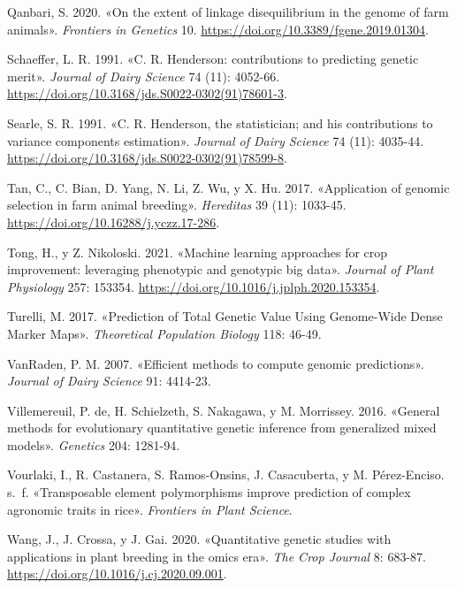 \documentclass[11pt,spanish,a4paper,oneside,]{book} %
\begin{document}
\leavevmode\hypertarget{ref-cite:36}{}%
Qanbari, S. 2020. «On the extent of linkage disequilibrium in the genome of farm animals». \emph{Frontiers in Genetics} 10. \url{https://doi.org/10.3389/fgene.2019.01304}.

\leavevmode\hypertarget{ref-cite:27}{}%
Schaeffer, L. R. 1991. «C. R. Henderson: contributions to predicting genetic merit». \emph{Journal of Dairy Science} 74 (11): 4052-66. \url{https://doi.org/10.3168/jds.S0022-0302(91)78601-3}.

\leavevmode\hypertarget{ref-cite:29}{}%
Searle, S. R. 1991. «C. R. Henderson, the statistician; and his contributions to variance components estimation». \emph{Journal of Dairy Science} 74 (11): 4035-44. \url{https://doi.org/10.3168/jds.S0022-0302(91)78599-8}.

\leavevmode\hypertarget{ref-cite:34}{}%
Tan, C., C. Bian, D. Yang, N. Li, Z. Wu, y X. Hu. 2017. «Application of genomic selection in farm animal breeding». \emph{Hereditas} 39 (11): 1033-45. \url{https://doi.org/10.16288/j.yczz.17-286}.

\leavevmode\hypertarget{ref-cite:7}{}%
Tong, H., y Z. Nikoloski. 2021. «Machine learning approaches for crop improvement: leveraging phenotypic and genotypic big data». \emph{Journal of Plant Physiology} 257: 153354. \url{https://doi.org/10.1016/j.jplph.2020.153354}.

\leavevmode\hypertarget{ref-cite:9}{}%
Turelli, M. 2017. «Prediction of Total Genetic Value Using Genome-Wide Dense Marker Maps». \emph{Theoretical Population Biology} 118: 46-49.

\leavevmode\hypertarget{ref-cite:39}{}%
VanRaden, P. M. 2007. «Efficient methods to compute genomic predictions». \emph{Journal of Dairy Science} 91: 4414-23.

\leavevmode\hypertarget{ref-cite:4}{}%
Villemereuil, P. de, H. Schielzeth, S. Nakagawa, y M. Morrissey. 2016. «General methods for evolutionary quantitative genetic inference from generalized mixed models». \emph{Genetics} 204: 1281-94.

\leavevmode\hypertarget{ref-cite:26}{}%
Vourlaki, I., R. Castanera, S. Ramos-Onsins, J. Casacuberta, y M. Pérez-Enciso. s.~f. «Transposable element polymorphisms improve prediction of complex agronomic traits in rice». \emph{Frontiers in Plant Science}.

\leavevmode\hypertarget{ref-cite:46}{}%
Wang, J., J. Crossa, y J. Gai. 2020. «Quantitative genetic studies with applications in plant breeding in the omics era». \emph{The Crop Journal} 8: 683-87. \url{https://doi.org/10.1016/j.cj.2020.09.001}.
\end{document}
